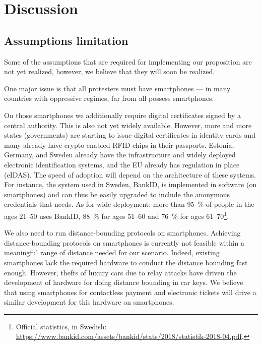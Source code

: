 \section{Discussion}%
\label{Discussion}

\subsection{Assumptions limitation} 

Some of the assumptions that are required for implementing our proposition are 
not yet realized, however, we believe that they will soon be realized.

One major issue is that all protesters must have smartphones --- in many 
countries with oppressive regimes, far from all possess smartphones.

On those smartphones we additionally require digital certificates signed by a 
central authority.
This is also not yet widely available.
However, more and more states (governments) are starting to issue digital 
certificates in identity cards and many already have crypto-enabled RFID chips 
in their passports.
\Eg Estonia, Germany, and Sweden already have the infrastructure and widely 
deployed electronic identification systems, and the EU already has regulation 
in place (eIDAS).
The speed of adoption will depend on the architecture of these systems.
For instance, the system used in Sweden, BankID, is implemented in software (on 
smartphones) and can thus be easily upgraded to include the anonymous 
credentials that \CROCUS needs.
As for wide deployment: more than \SI{95}{\%} of people in the ages 21--50 uses 
BankID, \SI{88}{\%} for ages 51--60 and \SI{76}{\%} for ages 
61--70\footnote{%
  Official statistics, in Swedish:  
  \url{https://www.bankid.com/assets/bankid/stats/2018/statistik-2018-04.pdf}.
}.

We also need to run distance-bounding protocols on smartphones.
Achieving distance-bounding protocols on smartphones is currently not feasible 
within a meaningful range of distance needed for our scenario.
Indeed, existing smartphones lack the required hardware to conduct the distance bounding fast enough.
However, thefts of luxury cars due to relay attacks have driven the development 
of hardware for doing distance bounding in car keys.
We believe that using smartphones for contactless payment and electronic 
tickets will drive a similar development for this hardware on smartphones.

